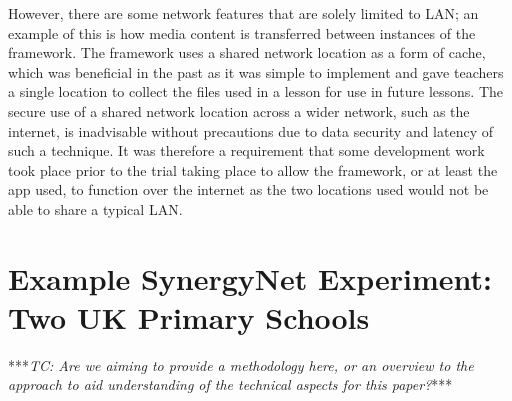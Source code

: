 \documentclass[a4paper,11pt]{article}
\begin{document}
However, there are some network features that are solely limited to LAN; an example of this is how media content is transferred between instances of the framework.
The framework uses a shared network location as a form of cache, which was beneficial in the past as it was simple to implement and gave teachers a single location to collect the files used in a lesson for use in future lessons.
The secure use of a shared network location across a wider network, such as the internet, is inadvisable without precautions due to data security and latency of such a technique.
It was therefore a requirement that some development work took place prior to the trial taking place to allow the framework, or at least the app used, to function over the internet as the two locations used would not be able to share a typical LAN.

\section{Example SynergyNet Experiment: Two UK Primary Schools}

***{\emph{TC: Are we aiming to provide a methodology here, or an overview to the approach to aid understanding of the technical aspects for this paper?}}***
\end{document}
